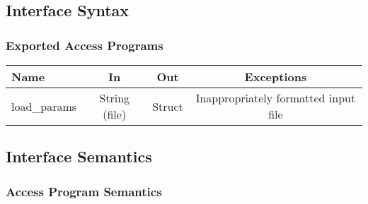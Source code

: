 \documentclass[12pt]{article}
\begin{document}
\subsection{Interface Syntax}



\subsubsection{Exported Access Programs}

\begin{center}
\begin{tabular}{l c c c}
\hline
\textbf{Name} & \textbf{In} & \textbf{Out} & \textbf{Exceptions} \\ \hline
load\_{params} & String (file) & Struct & Inappropriately formatted input file \\
\hline
\end{tabular}
\end{center}


\subsection{Interface Semantics}




\subsubsection{Access Program Semantics}
\end{document}
